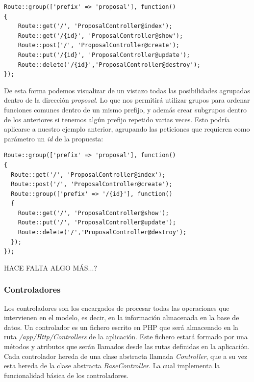 \lstset{
  language        = php}
\begin{lstlisting}[frame=single]
Route::group(['prefix' => 'proposal'], function()
{
    Route::get('/', 'ProposalController@index');
    Route::get('/{id}', 'ProposalController@show');
    Route::post('/', 'ProposalController@create');
    Route::put('/{id}', 'ProposalController@update');
    Route::delete('/{id}','ProposalController@destroy');
});
\end{lstlisting}

De esta forma podemos visualizar de un vistazo todas las posibilidades agrupadas dentro de la dirección \textit{proposal}. Lo que nos permitirá utilizar grupos para ordenar funciones comunes dentro de un mismo prefijo, y además crear subgrupos dentro de los anteriores si tenemos algún prefijo repetido varias veces. Esto podría aplicarse a nuestro ejemplo anterior, agrupando las peticiones que requieren como parámetro un \textit{id} de la propuesta:

\lstset{
  language        = php}
\begin{lstlisting}[frame=single]
Route::group(['prefix' => 'proposal'], function()
{
  Route::get('/', 'ProposalController@index');
  Route::post('/', 'ProposalController@create');
  Route::group(['prefix' => '/{id}'], function()
  {
    Route::get('/', 'ProposalController@show');
    Route::put('/', 'ProposalController@update');
    Route::delete('/','ProposalController@destroy');
  });
});
\end{lstlisting}

HACE FALTA ALGO MÁS...?

\subsubsection{Controladores}

Los controladores son los encargados de procesar todas las operaciones que intervienen en el modelo, es decir, en la información almacenada en la base de datos. Un controlador es un fichero escrito en PHP que será almacenado en la ruta \textit{/app/Http/Controllers} de la aplicación. Este fichero estará formado por una métodos y atributos que serán llamados desde las rutas definidas en la aplicación. Cada controlador hereda de una clase abstracta llamada \textit{Controller}, que a su vez esta hereda de la clase abstracta \textit{BaseController}. La cual implementa la funcionalidad básica de los controladores.

